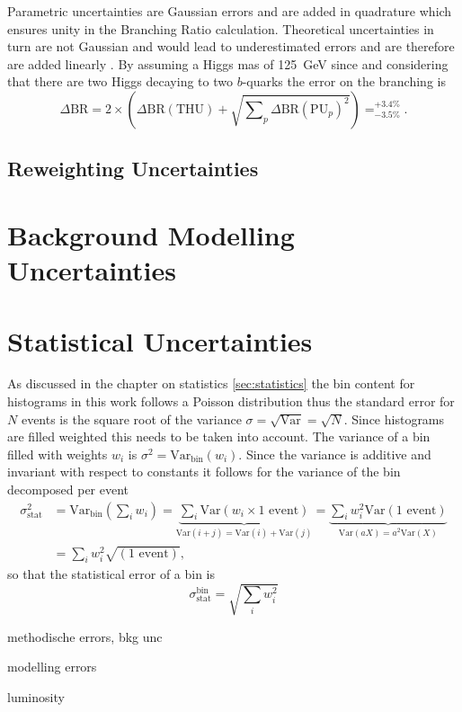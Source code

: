 Parametric uncertainties are Gaussian errors and are added in quadrature which ensures unity in the Branching Ratio calculation. Theoretical uncertainties in turn are not Gaussian and would lead to underestimated errors and are therefore are added linearly \citep{de2016arxiv}. By assuming a Higgs mas of \qty[]{125}{GeV} since and considering that there are two Higgs decaying to two $b$-quarks the error on the branching is 
\begin{equation}
\Delta\text{BR} = 2 \times \left(\Delta\text{BR}(\text{THU}) + \sqrt{\sum\nolimits_{p} \Delta\text{BR}(\text{PU}_{p})^2 }\right) = _{-3.5\%}^{+3.4\%}.
\end{equation}

\subsection{Reweighting Uncertainties}

\section{Background Modelling Uncertainties}

\section{Statistical Uncertainties}
As discussed in the chapter on statistics \ref{sec:statistics} the bin content for histograms in this work follows a Poisson distribution thus the standard error for $N$ events is the square root of the variance $\sigma=\sqrt{\text{Var}}=\sqrt{N}$. Since histograms are filled weighted this needs to be taken into account. The variance of a bin filled with weights $w_i$ is $\sigma^2 = \text{Var}_\text{bin}(w_i)$. Since the variance is additive and invariant with respect to constants it follows for the variance of the bin decomposed per event 
\begin{align}
    \sigma_\text{stat}^2 &= \text{Var}_\text{bin}\left(\sum_i w_i\right)
    =
    \underbrace{\sum_i \text{Var}(w_i \times 1\text{ event})}_{\text{Var}(i+j)=\text{Var}(i)+\text{Var}(j)}
    =
    \underbrace{\sum_i w_i^2\text{Var}(1\text{ event})}_{\text{Var}(aX)=a^2\text{Var}(X)}\\
    &=\sum_i w_i^2\sqrt{(1\text{ event})},
\end{align}
so that the statistical error of a bin is
\begin{equation}
    \sigma_\text{stat}^\text{bin}=\sqrt{\sum_i w_i^2}
\end{equation}

methodische errors, bkg unc


modelling errors


luminosity

